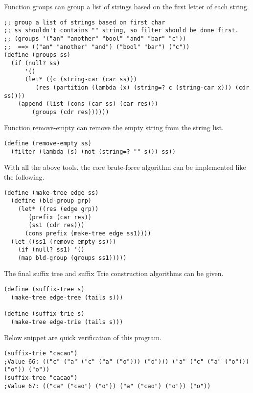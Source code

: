 \documentclass{article}
\begin{document}
Function groups can group a list of strings based on the first
letter of each string.

\begin{lstlisting}
;; group a list of strings based on first char
;; ss shouldn't contains "" string, so filter should be done first.
;; (groups '("an" "another" "bool" "and" "bar" "c"))
;;  ==> (("an" "another" "and") ("bool" "bar") ("c"))
(define (groups ss)
  (if (null? ss) 
      '()
      (let* ((c (string-car (car ss)))
	     (res (partition (lambda (x) (string=? c (string-car x))) (cdr ss))))
	(append (list (cons (car ss) (car res)))
		(groups (cdr res))))))
\end{lstlisting}

Function remove-empty can remove the empty string from the string list.

\begin{lstlisting}
(define (remove-empty ss)
  (filter (lambda (s) (not (string=? "" s))) ss))
\end{lstlisting}

With all the above tools, the core brute-force algorithm can be implemented
like the following.

\begin{lstlisting}
(define (make-tree edge ss)
  (define (bld-group grp)
    (let* ((res (edge grp))
	   (prefix (car res))
	   (ss1 (cdr res)))
      (cons prefix (make-tree edge ss1))))
  (let ((ss1 (remove-empty ss)))
    (if (null? ss1) '()
	(map bld-group (groups ss1)))))
\end{lstlisting}

The final suffix tree and suffix Trie construction algorithms can
be given.

\begin{lstlisting}
(define (suffix-tree s)
  (make-tree edge-tree (tails s)))

(define (suffix-trie s)
  (make-tree edge-trie (tails s)))
\end{lstlisting}

Below snippet are quick verification of this program.

\begin{lstlisting}
(suffix-trie "cacao") 
;Value 66: (("c" ("a" ("c" ("a" ("o"))) ("o"))) ("a" ("c" ("a" ("o"))) ("o")) ("o")) 
(suffix-tree "cacao") 
;Value 67: (("ca" ("cao") ("o")) ("a" ("cao") ("o")) ("o")) 
\end{lstlisting}

\end{document}
